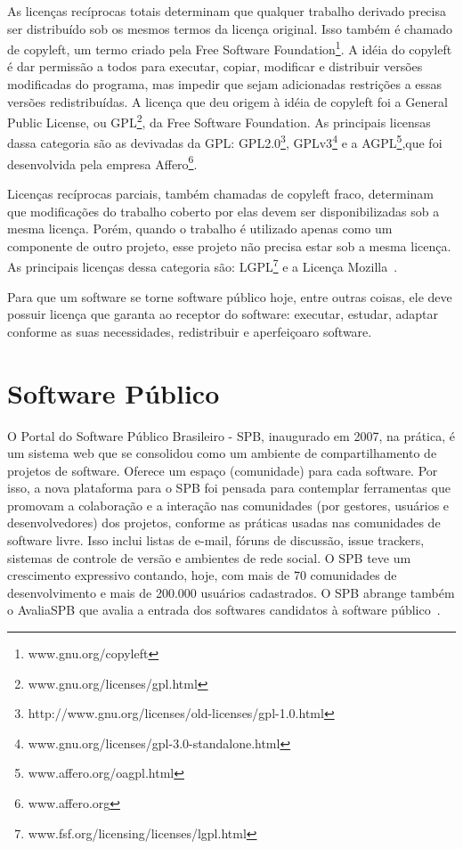 As licenças recíprocas totais determinam que qualquer trabalho derivado precisa 
ser distribuído sob os mesmos termos da licença original. Isso também é chamado de copyleft,
um termo criado pela Free Software Foundation\footnote{www.gnu.org/copyleft}. A idéia do
copyleft é dar permissão a todos para executar, copiar, modificar e distribuir versões
modificadas do programa, mas impedir que sejam adicionadas restrições a essas versões
redistribuídas. A licença que deu origem à idéia de copyleft foi a General Public 
License, ou GPL\footnote{www.gnu.org/licenses/gpl.html}, da Free Software Foundation.
As principais licensas dassa categoria são as devivadas da GPL: 
GPL2.0\footnote{http://www.gnu.org/licenses/old-licenses/gpl-1.0.html}, 
GPLv3\footnote{www.gnu.org/licenses/gpl-3.0-standalone.html} e a
AGPL\footnote{www.affero.org/oagpl.html},que foi desenvolvida pela empresa 
Affero\footnote{www.affero.org}.~\cite{sabino2009licenccas}

Licenças recíprocas parciais, também chamadas de copyleft fraco, determinam que
modificações do trabalho coberto por elas devem ser disponibilizadas sob a mesma 
licença. Porém, quando o trabalho é utilizado apenas como um componente de outro 
projeto, esse projeto não precisa estar sob a mesma licença. As principais licenças
dessa categoria são: LGPL\footnote{www.fsf.org/licensing/licenses/lgpl.html} e a
Licença Mozilla~\cite{sabino2009licenccas}.

Para que um software se torne software público hoje, entre outras coisas, ele deve
possuir licença que garanta ao receptor do software: executar, estudar, 
adaptar conforme as suas necessidades, redistribuir e aperfeiçoaro software. 

\section{Software Público}

O Portal do Software Público Brasileiro - SPB, inaugurado em 2007, na prática, é um sistema
web que se consolidou como um ambiente de compartilhamento de projetos de software. Oferece um
espaço (comunidade) para cada software. Por isso, a nova plataforma para o SPB foi pensada
para contemplar ferramentas que promovam a colaboração e a interação nas comunidades 
(por gestores, usuários e desenvolvedores) dos projetos, conforme as práticas usadas nas
comunidades de software livre. Isso inclui listas de e-mail, fóruns de discussão, 
issue trackers, sistemas de controle de versão e ambientes de rede social.
O SPB teve um crescimento expressivo contando, hoje, com mais de 70 comunidades
de desenvolvimento e mais de 200.000 usuários cadastrados. O SPB abrange também o 
AvaliaSPB que avalia a entrada dos softwares candidatos à software público~\cite{softwarepublico}.

